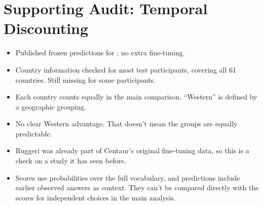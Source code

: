\section{Supporting Audit: Temporal Discounting}
\label{app:ruggeri}
\begin{itemize}
\item Published frozen predictions for \citet{ruggeri2022globalizability}; no extra fine-tuning.
\item Country information checked for most test participants, covering all 61 countries. Still missing for some participants.
\item Each country counts equally in the main comparison. ``Western'' is defined by a geographic grouping.
\item No clear Western advantage. That doesn't mean the groups are equally predictable.
\item Ruggeri was already part of Centaur's original fine-tuning data, so this is a check on a study it has seen before.
\item Scores use probabilities over the full vocabulary, and predictions include earlier observed answers as context. They can't be compared directly with the scores for independent choices in the main analysis.
\end{itemize}
